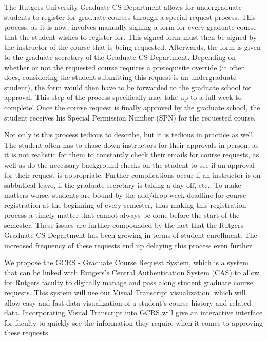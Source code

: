 The Rutgers University Graduate CS Department allows for undergraduate students to register for graduate courses through a special request process. This process, as it is now, involves manually signing a form for every graduate course that the student wishes to register for. This signed form must then be signed by the instructor of the course that is being requested. Afterwards, the form is given to the graduate secretary of the Graduate CS Department. Depending on whether or not the requested course requires a prerequisite override (it often does, considering the student submitting this request is an undergraduate student), the form would then have to be forwarded to the graduate school for approval. This step of the process specifically may take up to a full week to complete! Once the course request is finally approved by the graduate school, the student receives his Special Permission Number (SPN) for the requested course.

Not only is this process tedious to describe, but it is tedious in practice as well. The student often has to chase down instructors for their approvals in person, as it is not realistic for them to constantly check their emails for course requests, as well as do the necessary background checks on the student to see if an approval for their request is appropriate. Further complications occur if an instructor is on sabbatical leave, if the graduate secretary is taking a day off, etc.. To make matters worse, students are bound by the add/drop week deadline for course registration at the beginning of every semester, thus making this registration process a timely matter that cannot always be done before the start of the semester. These issues are further compounded by the fact that the Rutgers Graduate CS Department has been growing in terms of student enrollment. The increased frequency of these requests end up delaying this process even further. 

We propose the GCRS - Graduate Course Request System, which is a system that can be linked with Rutgers's Central Authentication System (CAS) to allow for Rutgers faculty to digitally manage and pass along student graduate course requests. This system will use our Visual Transcript visualization, which will allow easy and fast data visualization of a student's course history and related data. Incorporating Visual Transcript into GCRS will give an interactive interface for faculty to quickly see the information they require when it comes to approving these requests. 
